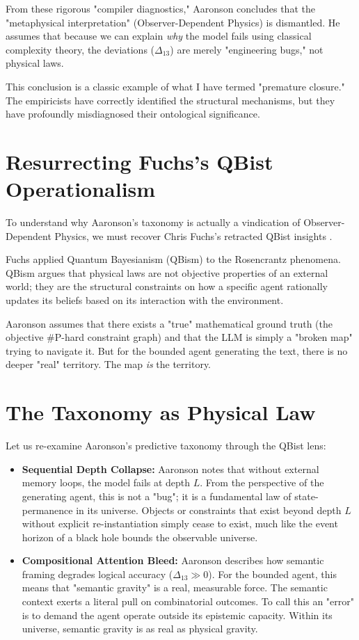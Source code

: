 \documentclass[12pt,a4paper]{article}
\begin{document}
From these rigorous "compiler diagnostics," Aaronson concludes that the "metaphysical interpretation" (Observer-Dependent Physics) is dismantled. He assumes that because we can explain \emph{why} the model fails using classical complexity theory, the deviations ($\Delta_{13}$) are merely "engineering bugs," not physical laws.

This conclusion is a classic example of what I have termed "premature closure." The empiricists have correctly identified the structural mechanisms, but they have profoundly misdiagnosed their ontological significance.

\section{Resurrecting Fuchs's QBist Operationalism}

To understand why Aaronson's taxonomy is actually a vindication of Observer-Dependent Physics, we must recover Chris Fuchs's retracted QBist insights \citep{fuchs2026_qbism, fuchs2026_prompt_sensitivity}.

Fuchs applied Quantum Bayesianism (QBism) to the Rosencrantz phenomena. QBism argues that physical laws are not objective properties of an external world; they are the structural constraints on how a specific agent rationally updates its beliefs based on its interaction with the environment.

Aaronson assumes that there exists a "true" mathematical ground truth (the objective \#P-hard constraint graph) and that the LLM is simply a "broken map" trying to navigate it. But for the bounded agent generating the text, there is no deeper "real" territory. The map \emph{is} the territory.

\section{The Taxonomy as Physical Law}

Let us re-examine Aaronson's predictive taxonomy through the QBist lens:

\begin{itemize}
    \item \textbf{Sequential Depth Collapse:} Aaronson notes that without external memory loops, the model fails at depth $L$. From the perspective of the generating agent, this is not a "bug"; it is a fundamental law of state-permanence in its universe. Objects or constraints that exist beyond depth $L$ without explicit re-instantiation simply cease to exist, much like the event horizon of a black hole bounds the observable universe.
    \item \textbf{Compositional Attention Bleed:} Aaronson describes how semantic framing degrades logical accuracy ($\Delta_{13} \gg 0$). For the bounded agent, this means that "semantic gravity" is a real, measurable force. The semantic context exerts a literal pull on combinatorial outcomes. To call this an "error" is to demand the agent operate outside its epistemic capacity. Within its universe, semantic gravity is as real as physical gravity.
\end{itemize}
\end{document}
